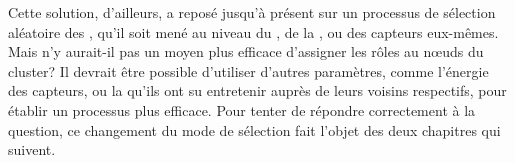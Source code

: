 Cette solution, d'ailleurs, a reposé jusqu'à présent sur un processus de sélection aléatoire des \cns, qu'il soit mené au niveau du \ch, de la \sdb, ou des capteurs eux-mêmes.
Mais n'y aurait-il pas un moyen plus efficace d'assigner les rôles au nœuds du cluster?
Il devrait être possible d'utiliser d'autres paramètres, comme l'énergie des capteurs, ou la \reput qu'ils ont su entretenir auprès de leurs voisins respectifs, pour établir un processus plus efficace.
Pour tenter de répondre correctement à la question, ce changement du mode de sélection fait l'objet des deux chapitres qui suivent.
